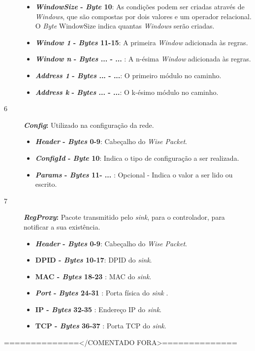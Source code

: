 \begin{description}
\begin{itemize}
            \item \textbf{\textit{WindowSize} - \textit{Byte} 10}: As condições podem ser criadas através de \textit{Windows}, que são compostas por dois valores e um operador relacional. O \textit{Byte} WindowSize indica quantas \textit{Windows} serão criadas.
            \item \textbf{\textit{Window 1} - \textit{Bytes} 11-15}: A primeira \textit{Window} adicionada às regras.
            \item \textbf{\textit{Window n} - \textit{Bytes} ... - ... }: A n-ésima \textit{Window} adicionada às regras.
            \item \textbf{\textit{Address 1} - \textit{Bytes} ... - ...}: O primeiro módulo no caminho.
            \item \textbf{\textit{Address k} - \textit{Bytes} ... - ...}: O k-ésimo módulo no caminho.
        \end{itemize}
    \item [6]\textbf{\textit{Config}:} Utilizado na configuração da rede.
        \begin{itemize} 
            \item \textbf{\textit{Header} - \textit{Bytes} 0-9}: Cabeçalho do \textit{ Wise Packet}.
            \item \textbf{\textit{ConfigId} - \textit{Byte} 10}: Indica o tipo de configuração a ser realizada.
            \item \textbf{\textit{Params} - \textit{Bytes} 11- ... }: Opcional - Indica o valor a ser lido ou escrito.
        \end{itemize}
    \item [7]\textbf{\textit{RegProxy}:} Pacote transmitido pelo \textit{sink}, para o controlador, para notificar a sua existência.
        \begin{itemize} 
            \item \textbf{\textit{Header} - \textit{Bytes} 0-9}: Cabeçalho do \textit{ Wise Packet}.
            \item \textbf{\ac{DPID} - \textit{Bytes} 10-17}: \ac{DPID} do \textit{sink}.
            \item \textbf{\ac{MAC} - \textit{Bytes} 18-23 }: \ac{MAC} do \textit{sink}.
            \item \textbf{\textit{Port} - \textit{Bytes} 24-31 }: Porta física do \textit{sink} .
            \item \textbf{\ac{IP} - \textit{Bytes} 32-35 }: Endereço \ac{IP} do \textit{sink}.
            \item \textbf{\ac{TCP} - \textit{Bytes} 36-37 }: Porta \ac{TCP} do \textit{sink}.
        \end{itemize}
\end{description}
==============</COMENTADO FORA>==============
\fi

